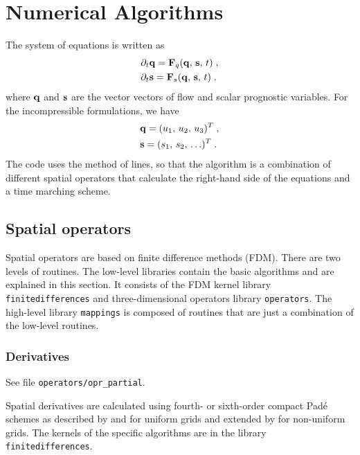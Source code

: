 \chapter{Numerical Algorithms}\label{sec:numerics}

The system of equations is written as
\begin{subequations}
    \begin{align}
        &\partial_t \mathbf{q} = \mathbf{F}_q(\mathbf{q},\,\mathbf{s},\,t) \;,\\
        &\partial_t \mathbf{s} = \mathbf{F}_s(\mathbf{q},\,\mathbf{s},\,t) \;.
    \end{align}
\end{subequations}
where $\mathbf{q}$ and $\mathbf{s}$ are the vector vectors of flow and scalar prognostic variables. For the incompressible formulations, we have
\begin{subequations}
    \begin{align}
        &\mathbf{q} = (u_1,\,u_2,\,u_3)^T \;,\\
        &\mathbf{s} = (s_1,\,s_2,\,\ldots)^T\;.
    \end{align}
\end{subequations}
The code uses the method of lines, so that the algorithm is a combination of different spatial operators that calculate the right-hand side of the equations and a time marching scheme. 

\section{Spatial operators}

Spatial operators are based on finite difference methods (FDM). There are two levels of routines. The low-level libraries contain the basic algorithms and are explained in this section. It consists of the FDM kernel library {\tt finitedifferences} and three-dimensional operators library {\tt operators}. The high-level library {\tt mappings} is composed of routines that are just a combination of the low-level routines.

\subsection{Derivatives}\label{sec:fdm}

See file {\tt operators/opr\_partial}. 

Spatial derivatives are calculated using fourth- or sixth-order compact Pad\'{e} schemes as described by \cite{lele1992compact} and \cite{lamballais2011straightforward} for uniform grids and extended by \cite{shukla2005derivation} for non-uniform grids. The kernels of the specific algorithms are in the library {\tt finitedifferences}.


